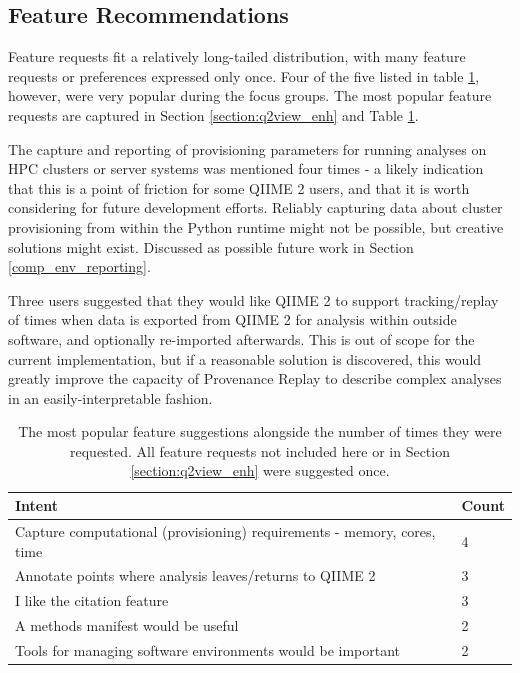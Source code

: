 \subsection{Feature Recommendations}

Feature requests fit a relatively long-tailed distribution, with many feature
requests or preferences expressed only once. Four of the five listed in table \ref{tab:feature_requests},
however, were very popular during the focus groups. The most popular feature
requests are captured in Section \ref{section:q2view_enh} and Table \ref{tab:feature_requests}.

The capture and reporting of provisioning parameters for running analyses on HPC
clusters or server systems was mentioned four times - a likely indication that
this is a point of friction for some QIIME 2 users, and that it is worth
considering for future development efforts. Reliably capturing data about
cluster provisioning from within the Python runtime might not be possible, but
creative solutions might exist. Discussed as possible future work in Section
\ref{comp_env_reporting}.

Three users suggested that they would like QIIME 2 to support tracking/replay of
times when data is exported from QIIME 2 for analysis within outside software,
and optionally re-imported afterwards. This is out of scope for the current
implementation, but if a reasonable solution is discovered, this would greatly
improve the capacity of Provenance Replay to describe complex analyses in an
easily-interpretable fashion.

\begin{table}[htp]
    \centering

    \begin{tabular}{|p{}|p{}|}
    \hline
    Intent                                                                  & Count \\ \hline
    Capture computational (provisioning) requirements - memory, cores, time & 4     \\
    Annotate points where analysis leaves/returns to QIIME 2                & 3     \\
    I like the citation feature                                             & 3     \\
    A methods manifest would be useful                                      & 2     \\
    Tools for managing software environments would be important             & 2     \\ \hline
    \end{tabular}

    \caption[Focus Group feature requests selected by popularity]%
    {The most popular feature suggestions alongside the number of times they
    were requested. All feature requests not included here or in Section
    \ref{section:q2view_enh} were suggested once.}
    \label{tab:feature_requests}
\end{table}

